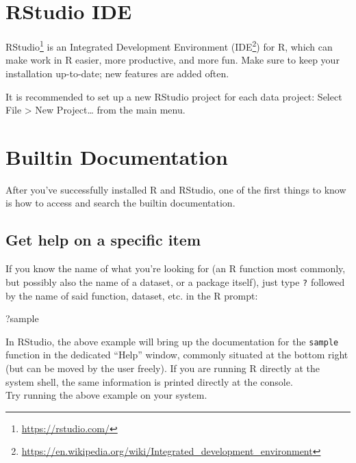 \documentclass[
]{book}
\newenvironment{Shaded}{\begin{snugshade}}{\end{snugshade}}
\newcommand{\NormalTok}[1]{#1}
\renewcommand{\href}[2]{#2\footnote{\url{#1}}}
\begin{document}
\hypertarget{rstudio-ide}{%
\section{RStudio IDE}\label{rstudio-ide}}

\href{https://rstudio.com/}{RStudio} is an Integrated Development Environment (\href{https://en.wikipedia.org/wiki/Integrated_development_environment}{IDE}) for R, which can make work in R easier, more productive, and more fun. Make sure to keep your installation up-to-date; new features are added often.

It is recommended to set up a new RStudio project for each data project: Select File \textgreater{} New Project\ldots{} from the main menu.

\hypertarget{builtin-documentation}{%
\section{Builtin Documentation}\label{builtin-documentation}}

After you've successfully installed R and RStudio, one of the first things to know is how to access and search the builtin documentation.

\hypertarget{get-help-on-a-specific-item}{%
\subsection{Get help on a specific item}\label{get-help-on-a-specific-item}}

If you know the name of what you're looking for (an R function most commonly, but possibly also the name of a dataset, or a package itself), just type \texttt{?} followed by the name of said function, dataset, etc. in the R prompt:

\begin{Shaded}
\begin{Highlighting}[]
\NormalTok{?sample}
\end{Highlighting}
\end{Shaded}

In RStudio, the above example will bring up the documentation for the \texttt{sample} function in the dedicated ``Help'' window, commonly situated at the bottom right (but can be moved by the user freely). If you are running R directly at the system shell, the same information is printed directly at the console.\\
Try running the above example on your system.
\end{document}
